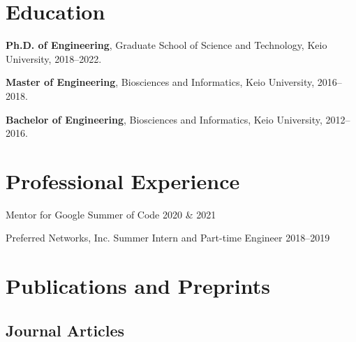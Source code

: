\documentclass[letterpaper]{article}
\renewenvironment{itemize}{
  \begin{list}{}{
    \setlength{\leftmargin}{1.5em}
  }
}{
  \end{list}
}
\begin{document}
\section*{\bf Education}
\vspace{-0.6cm}
\hrulefill

\begin{itemize}
 \item {\bf Ph.D. of Engineering}, Graduate School of Science and Technology, Keio University, 2018--2022.
 \item {\bf Master of Engineering}, Biosciences and Informatics, Keio University, 2016--2018.
 \item {\bf Bachelor of Engineering}, Biosciences and Informatics, Keio University, 2012--2016.
       \\
\end{itemize}


\section*{\bf Professional Experience}
\vspace{-0.6cm}
\hrulefill

\begin{itemize}
 \item Mentor for Google Summer of Code 2020 \& 2021
 \item Preferred Networks, Inc. Summer Intern and Part-time Engineer 2018--2019
       \\
\end{itemize}


\section*{\bf Publications and Preprints}
\vspace{-0.6cm}
\hrulefill
\vspace{-0.3cm}

\subsection*{\bf Journal Articles}
\end{document}
